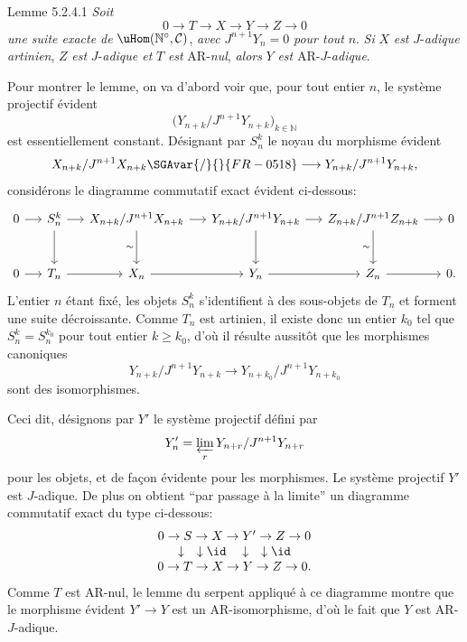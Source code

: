 \begin{statement}{Lemme 5.2.4.1}
\emph{Soit}
\[
0\longrightarrow T\longrightarrow X\longrightarrow Y\longrightarrow Z\longrightarrow0
\]
\emph{une suite exacte de} \(\uHom(\mathbb{N}^\circ,\mathcal{C})\), \emph{avec} \(J^{n+1}Y_n=0\) \emph{pour tout} \(n\). \emph{Si} \(X\) \emph{est} \(J\)-\emph{adique artinien}, \(Z\) \emph{est} \(J\)-\emph{adique et} \(T\) \emph{est} AR-\emph{nul}, \emph{alors} \(Y\) \emph{est} AR-\(J\)-\emph{adique}.
\end{statement}

Pour montrer le lemme, on va d'abord voir que, pour tout entier \(n\), le système projectif évident
\[
\bigl(Y_{n+k}/J^{n+1}Y_{n+k}\bigr)_{k\in\mathbb{N}}
\]
est essentiellement constant. Désignant par \(S_n^k\) le noyau du morphisme évident
\[
X_{n+k}/J^{n+1}X_{n+k}\SGAvar{/}{}{FR-0518}\longrightarrow
Y_{n+k}/J^{n+1}Y_{n+k},
\]
considérons le diagramme commutatif exact évident ci-dessous:
\[
\begin{tikzcd}[column sep=1.35em,row sep=large]
0 \arrow[r] & S_n^k \arrow[r] \arrow[d] & X_{n+k}/J^{n+1}X_{n+k} \arrow[r] \arrow[d,"\sim"'] & Y_{n+k}/J^{n+1}Y_{n+k} \arrow[r] \arrow[d] & Z_{n+k}/J^{n+1}Z_{n+k} \arrow[r] \arrow[d,"\sim"'] & 0\\
0 \arrow[r] & T_n \arrow[r] & X_n \arrow[r] & Y_n \arrow[r] & Z_n \arrow[r] & 0 .
\end{tikzcd}
\]
L'entier \(n\) étant fixé, les objets \(S_n^k\) s'identifient à des sous-objets de \(T_n\) et forment une suite décroissante. Comme \(T_n\) est artinien, il existe donc un entier \(k_0\) tel que \(S_n^k=S_n^{k_0}\) pour tout entier \(k\ge k_0\), d'où il résulte aussitôt que les morphismes canoniques
\[
Y_{n+k}/J^{n+1}Y_{n+k}
\longrightarrow
Y_{n+k_0}/J^{n+1}Y_{n+k_0}
\]
sont des isomorphismes.

Ceci dit, désignons par \(Y'\) le système projectif défini par
\[
Y'_n=\varprojlim_r Y_{n+r}/J^{n+1}Y_{n+r}
\]
pour les objets, et de façon évidente pour les morphismes. Le système projectif \(Y'\) est \(J\)-adique. De plus on obtient ``par passage à la limite'' un diagramme commutatif exact du type ci-dessous:
\[
\begin{array}{ccccc}
0\to S\to X\to Y'\to Z\to0\\
\downarrow\quad\downarrow\id\quad\downarrow\quad\downarrow\id\\
0\to T\to X\to Y\to Z\to0 .
\end{array}
\]
Comme \(T\) est AR-nul, le lemme du serpent appliqué à ce diagramme montre que le morphisme évident \(Y'\to Y\) est un AR-isomorphisme, d'où le fait que \(Y\) est AR-\(J\)-adique.

